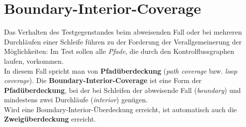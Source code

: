 \section{Boundary-Interior-Coverage}

\begin{tcolorbox}[title=Boundary-Interior-Coverage]
    Das Verhalten des Testgegenstandes beim abweisenden Fall oder bei mehreren Durchläufen einer Schleife führen zu der Forderung der Verallgemeinerung der Möglichkeiten: Im Test sollen alle \textit{Pfade}, die durch den Kontrolflussgraphen laufen, vorkommen.\\
    In diesem Fall spricht man von \textbf{Pfadüberdeckung} (\textit{path coverage} bzw. \textit{loop coverage}).
    Die \textbf{Boundary-Interior-Coverage} ist eine Form der \textbf{Pfadüberdeckung}, bei der bei Schleifen der abweisende Fall (\textit{boundary}) und mindestens zwei Durchläufe (\textit{interior}) genügen.\\
    Wird eine Boundary-Interior-Überdeckung erreicht, ist automatisch auch die \textbf{Zweigüberdeckung} erreicht.
\end{tcolorbox}